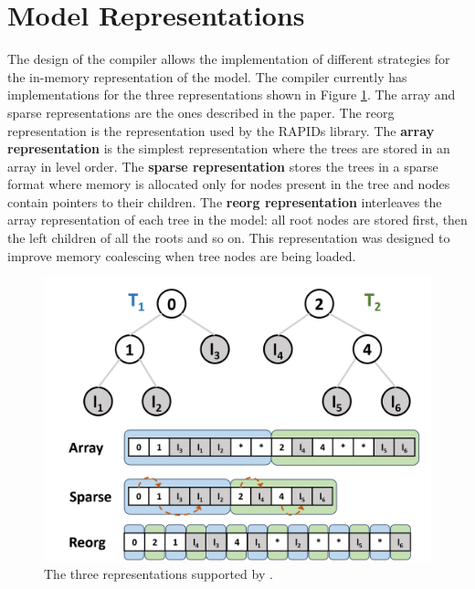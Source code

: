 \section{Model Representations}
\label{sec:representations}

The design of the \Treebeard{} compiler allows the implementation of different strategies for 
the in-memory representation of the model. The compiler currently has implementations for 
the three representations shown in Figure \ref{Fig:Representations}. The array and sparse 
representations are the ones described in the \TreebeardOLD{} paper\cite{Treebeard}. The reorg 
representation is the representation used by the RAPIDs library\cite{FIL}. 
The \textbf{array representation} is the simplest representation where the trees are stored in an array
in level order. The \textbf{sparse representation} stores the trees in a sparse format where 
memory is allocated only for nodes present in the tree and nodes contain pointers to their children. The \textbf{reorg representation}
interleaves the array representation of each tree in the model: all root nodes are stored first, then 
the left children of all the roots and so on. This representation was 
designed to improve memory coalescing when tree nodes are being loaded. 
\begin{figure}[htb]
  \centering
  \includegraphics[width=0.7\linewidth]{figures/representations.png}
  \caption{The three representations supported by \Treebeard{}.}
  \label{Fig:Representations}
\end{figure}

